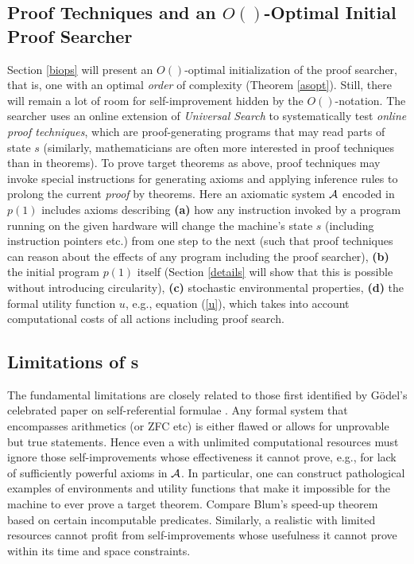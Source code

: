 \subsection{Proof Techniques and an $O()$-Optimal Initial Proof Searcher}
Section \ref{biops} will present an $O()$-optimal 
initialization of the proof searcher,
that is, one with an optimal {\em order} of complexity
(Theorem \ref{asopt}).  Still, there will remain a lot of 
room for self-improvement hidden by the $O()$-notation. 
The searcher
uses an online extension of {\em Universal Search} 
\cite{Levin:73,Levin:84}
to systematically test {\em online
proof techniques}, which are proof-generating programs that
may read parts of state $s$
(similarly, mathematicians are often more interested in 
proof techniques than in theorems).
To prove target theorems as above,
proof techniques may invoke special instructions
for generating axioms and applying inference rules to prolong the 
current {\em proof} by theorems. Here
an axiomatic system $\cal A$ 
encoded in $p(1)$
includes axioms describing {\bf (a)} how any instruction invoked
by a program running on the given hardware will change 
the machine's state $s$ 
(including instruction pointers etc.)
from one step to the next (such that proof techniques can reason
about the effects of any program including the proof searcher),
{\bf (b)} the initial program $p(1)$ itself (Section \ref{details} will show
that this is possible without introducing circularity),
{\bf (c)} stochastic environmental properties,
{\bf (d)} the formal utility function $u$, 
e.g., equation (\ref{u}), 
which takes into account
computational costs of all actions including proof search.



\subsection{Limitations of \GMn s}
\label{limits}
The fundamental limitations are closely related to
those first identified by G\"{o}del's celebrated paper on
self-referential formulae \cite{Goedel:31}.
Any formal system that encompasses arithmetics (or ZFC etc)
is either flawed or allows for unprovable but true statements.
Hence even a \gm with unlimited computational
resources must ignore those self\--im\-prove\-ments
whose effectiveness it cannot prove,
e.g., for lack of sufficiently powerful axioms in $\cal A$.
In particular, one can construct pathological
examples of environments and
utility functions that make it impossible for the machine
to ever prove a target theorem.
Compare Blum's speed-up theorem 
\cite{Blum:67,Blum:71}
based on certain incomputable predicates.
Similarly, a realistic \gm with limited resources
cannot profit from self\--im\-prove\-ments
whose usefulness it cannot prove within
its time and space constraints.

